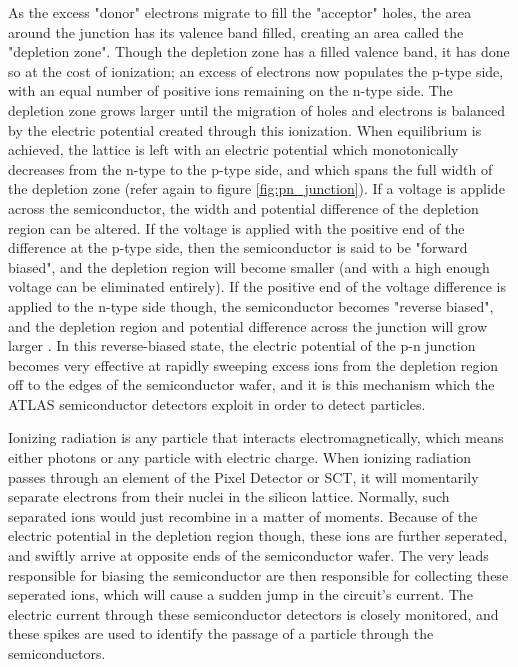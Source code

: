         As the excess "donor" electrons migrate to fill the "acceptor" holes, the area around the junction has its valence band filled, creating an area called the "depletion zone".
        Though the depletion zone has a filled valence band, it has done so at the cost of ionization; an excess of electrons now populates the p-type side, with an equal number of positive ions remaining on the n-type side.
        The depletion zone grows larger until the migration of holes and electrons is balanced by the electric potential created through this ionization.
        When equilibrium is achieved, the lattice is left with an electric potential which monotonically decreases from the n-type to the p-type side, and which spans the full width of the depletion zone (refer again to figure \ref{fig:pn_junction}).
        If a voltage is applide across the semiconductor, the width and potential difference of the depletion region can be altered.
        If the voltage is applied with the positive end of the difference at the p-type side, then the semiconductor is said to be "forward biased", and the depletion region will become smaller (and with a high enough voltage can be eliminated entirely).
        If the positive end of the voltage difference is applied to the n-type side though, the semiconductor becomes "reverse biased", and the depletion region and potential difference across the junction will grow larger \cite{wiley_radiation_detection}.
        In this reverse-biased state, the electric potential of the p-n junction becomes very effective at rapidly sweeping excess ions from the depletion region off to the edges of the semiconductor wafer, and it is this mechanism which the ATLAS semiconductor detectors exploit in order to detect particles.

        Ionizing radiation is any particle that interacts electromagnetically, which means either photons or any particle with electric charge.
        When ionizing radiation passes through an element of the Pixel Detector or SCT, it will momentarily separate electrons from their nuclei in the silicon lattice.
        Normally, such separated ions would just recombine in a matter of moments.
        Because of the electric potential in the depletion region though, these ions are further seperated, and swiftly arrive at opposite ends of the semiconductor wafer.
        The very leads responsible for biasing the semiconductor are then responsible for collecting these seperated ions, which will cause a sudden jump in the circuit's current.
        The electric current through these semiconductor detectors is closely monitored, and these spikes are used to identify the passage of a particle through the semiconductors.


